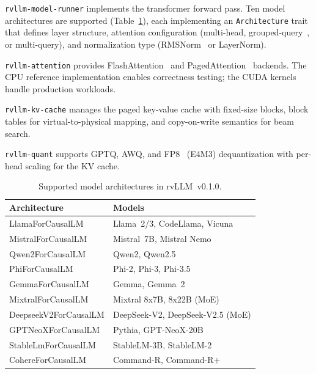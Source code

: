 \documentclass[11pt,a4paper]{article}
\newcommand{\thead}[1]{\textbf{\color{white}#1}}
\begin{document}
\texttt{rvllm-model-runner} implements the transformer forward pass. Ten model
architectures are supported (Table~\ref{tab:architectures}), each implementing an
\texttt{Architecture} trait that defines layer structure, attention configuration
(multi-head, grouped-query~\cite{ainslie2023gqa}, or multi-query), and normalization
type (RMSNorm~\cite{zhang2019root} or LayerNorm).

\texttt{rvllm-attention} provides FlashAttention~\cite{dao2022flashattention,
dao2023flashattention2} and PagedAttention~\cite{kwon2023vllm} backends. The CPU
reference implementation enables correctness testing; the CUDA kernels handle
production workloads.

\texttt{rvllm-kv-cache} manages the paged key-value cache with fixed-size blocks,
block tables for virtual-to-physical mapping, and copy-on-write semantics for beam
search.

\texttt{rvllm-quant} supports GPTQ, AWQ, and FP8~\cite{holkman2023fp8} (E4M3)
dequantization with per-head scaling for the KV cache.

\begin{table}[t]
  \centering
  \caption{Supported model architectures in rvLLM~v0.1.0.}
  \label{tab:architectures}
  \small
  \begin{tabular}{@{}ll@{}}
    \toprule
    \rowcolor{HeaderBlue} \thead{Architecture} & \thead{Models} \\
    \midrule
    LlamaForCausalLM      & Llama~2/3, CodeLlama, Vicuna \\
    \rowcolor{gray!8}
    MistralForCausalLM     & Mistral~7B, Mistral Nemo \\
    Qwen2ForCausalLM       & Qwen2, Qwen2.5 \\
    \rowcolor{gray!8}
    PhiForCausalLM         & Phi-2, Phi-3, Phi-3.5 \\
    GemmaForCausalLM       & Gemma, Gemma~2 \\
    \rowcolor{gray!8}
    MixtralForCausalLM     & Mixtral 8x7B, 8x22B (MoE) \\
    DeepseekV2ForCausalLM  & DeepSeek-V2, DeepSeek-V2.5 (MoE) \\
    \rowcolor{gray!8}
    GPTNeoXForCausalLM     & Pythia, GPT-NeoX-20B \\
    StableLmForCausalLM    & StableLM-3B, StableLM-2 \\
    \rowcolor{gray!8}
    CohereForCausalLM      & Command-R, Command-R+ \\
    \bottomrule
  \end{tabular}
\end{table}
\end{document}
